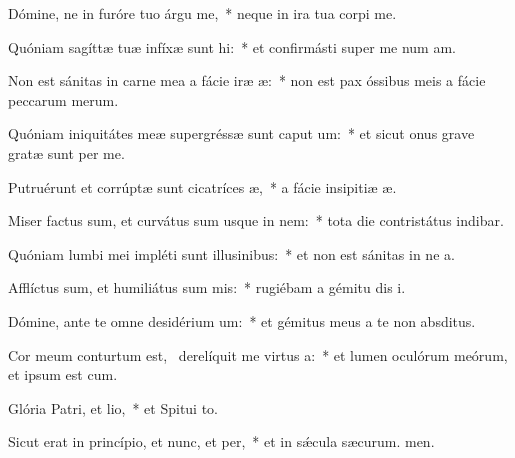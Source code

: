 \item Dómine, ne in furóre tuo árgu me,~* neque in ira tua corpi me.
\item Quóniam sagíttæ tuæ infíxæ sunt hi:~* et confirmásti super me num am.
\item Non est sánitas in carne mea a fácie iræ æ:~* non est pax óssibus meis a fácie peccarum merum.
\item Quóniam iniquitátes meæ supergréssæ sunt caput um:~* et sicut onus grave gratæ sunt per me.
\item Putruérunt et corrúptæ sunt cicatríces æ,~* a fácie insipitiæ æ.
\item Miser factus sum, et curvátus sum usque in nem:~* tota die contristátus indibar.
\item Quóniam lumbi mei impléti sunt illusinibus:~* et non est sánitas in ne a.
\item Afflíctus sum, et humiliátus sum mis:~* rugiébam a gémitu dis i.
\item Dómine, ante te omne desidérium um:~* et gémitus meus a te non  absditus.
\item Cor meum conturtum est,~\pscross{} derelíquit me virtus a:~* et lumen oculórum meórum, et ipsum  est cum.
\item Glória Patri, et lio,~* et Spitui to.
\item Sicut erat in princípio, et nunc, et per,~* et in sǽcula sæcurum. men.
